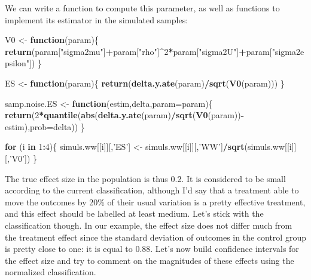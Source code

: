 \documentclass[]{book}
\newenvironment{Shaded}{\begin{snugshade}}{\end{snugshade}}
\newcommand{\KeywordTok}[1]{\textcolor[rgb]{0.13,0.29,0.53}{\textbf{#1}}}
\newcommand{\DataTypeTok}[1]{\textcolor[rgb]{0.13,0.29,0.53}{#1}}
\newcommand{\DecValTok}[1]{\textcolor[rgb]{0.00,0.00,0.81}{#1}}
\newcommand{\StringTok}[1]{\textcolor[rgb]{0.31,0.60,0.02}{#1}}
\newcommand{\ControlFlowTok}[1]{\textcolor[rgb]{0.13,0.29,0.53}{\textbf{#1}}}
\newcommand{\OperatorTok}[1]{\textcolor[rgb]{0.81,0.36,0.00}{\textbf{#1}}}
\newcommand{\NormalTok}[1]{#1}
\theoremstyle{definition}
\theoremstyle{definition}
\theoremstyle{definition}
\theoremstyle{remark}
\begin{document}
We can write a function to compute this parameter, as well as functions
to implement its estimator in the simulated samples:

\begin{Shaded}
\begin{Highlighting}[]
\NormalTok{V0 <-}\StringTok{ }\ControlFlowTok{function}\NormalTok{(param)\{}
  \KeywordTok{return}\NormalTok{(param[}\StringTok{"sigma2mu"}\NormalTok{]}\OperatorTok{+}\NormalTok{param[}\StringTok{"rho"}\NormalTok{]}\OperatorTok{^}\DecValTok{2}\OperatorTok{*}\NormalTok{param[}\StringTok{"sigma2U"}\NormalTok{]}\OperatorTok{+}\NormalTok{param[}\StringTok{"sigma2epsilon"}\NormalTok{])}
\NormalTok{\}}

\NormalTok{ES <-}\StringTok{ }\ControlFlowTok{function}\NormalTok{(param)\{}
  \KeywordTok{return}\NormalTok{(}\KeywordTok{delta.y.ate}\NormalTok{(param)}\OperatorTok{/}\KeywordTok{sqrt}\NormalTok{(}\KeywordTok{V0}\NormalTok{(param)))}
\NormalTok{\}}

\NormalTok{samp.noise.ES <-}\StringTok{ }\ControlFlowTok{function}\NormalTok{(estim,delta,}\DataTypeTok{param=}\NormalTok{param)\{}
  \KeywordTok{return}\NormalTok{(}\DecValTok{2}\OperatorTok{*}\KeywordTok{quantile}\NormalTok{(}\KeywordTok{abs}\NormalTok{(}\KeywordTok{delta.y.ate}\NormalTok{(param)}\OperatorTok{/}\KeywordTok{sqrt}\NormalTok{(}\KeywordTok{V0}\NormalTok{(param))}\OperatorTok{-}\NormalTok{estim),}\DataTypeTok{prob=}\NormalTok{delta))}
\NormalTok{\}}

\ControlFlowTok{for}\NormalTok{ (i }\ControlFlowTok{in} \DecValTok{1}\OperatorTok{:}\DecValTok{4}\NormalTok{)\{}
\NormalTok{  simuls.ww[[i]][,}\StringTok{'ES'}\NormalTok{] <-}\StringTok{ }\NormalTok{simuls.ww[[i]][,}\StringTok{'WW'}\NormalTok{]}\OperatorTok{/}\KeywordTok{sqrt}\NormalTok{(simuls.ww[[i]][,}\StringTok{'V0'}\NormalTok{])}
\NormalTok{\}}
\end{Highlighting}
\end{Shaded}

The true effect size in the population is thus 0.2. It is considered to
be small according to the current classification, although I'd say that
a treatment able to move the outcomes by 20\% of their usual variation
is a pretty effective treatment, and this effect should be labelled at
least medium. Let's stick with the classification though. In our
example, the effect size does not differ much from the treatment effect
since the standard deviation of outcomes in the control group is pretty
close to one: it is equal to 0.88. Let's now build confidence intervals
for the effect size and try to comment on the magnitudes of these
effects using the normalized classification.
\end{document}
